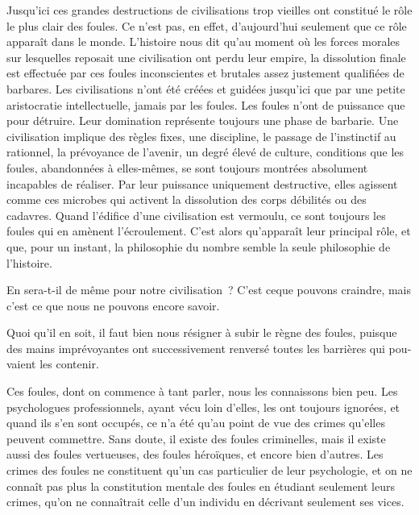 \documentclass[french,twoside]{book} %
\begin{document}
Jusqu’ici ces grandes destructions de civilisations trop vieilles ont constitué le rôle le plus clair des foules. Ce n’est pas, en effet, d’aujourd’hui seulement que ce rôle apparaît dans le monde. L’histoire nous dit qu’au moment où les forces morales sur lesquelles reposait une civilisation ont perdu leur empire, la dissolution finale est effectuée par ces foules inconscientes et brutales assez juste­ment qualifiées de barbares. Les civilisations n’ont été créées et guidées jusqu’ici que par une petite aristocratie intellectuelle, jamais par les foules. Les foules n’ont de puissance que pour détruire. Leur domination représente toujours une phase de barbarie. Une civilisation implique des règles fixes, une discipline, le passage de l’instinctif au rationnel, la prévoyance de l’avenir, un degré élevé de culture, conditions que les foules, abandon­nées à elles-mêmes, se sont toujours montrées absolument incapables de réaliser. Par leur puissance uniquement destructive, elles agissent comme ces microbes qui acti­vent la dissolution des corps débilités ou des cadavres. Quand l’édifice d’une civili­sation est ver­moulu, ce sont toujours les foules qui en amènent l’écroulement. C’est alors qu’apparaît leur principal rôle, et que, pour un instant, la philosophie du nombre semble la seule philosophie de l’histoire.\par
En sera-t-il de même pour notre civilisation ? C’est ceque pouvons craindre, mais c’est ce que nous ne pouvons encore savoir.\par
Quoi qu’il en soit, il faut bien nous résigner à subir le règne des foules, puisque des mains imprévoyantes ont successivement renversé toutes les barrières qui pou­vaient les contenir.\par
Ces foules, dont on commence à tant parler, nous les connaissons bien peu. Les psychologues professionnels, ayant vécu loin d’elles, les ont toujours ignorées, et quand ils s’en sont occupés, ce n’a été qu’au point de vue des crimes qu’elles peuvent commettre. Sans doute, il existe des foules criminelles, mais il existe aussi des foules vertueuses, des foules héroïques, et encore bien d’autres. Les crimes des foules ne constituent qu’un cas particulier de leur psychologie, et on ne connaît pas plus la constitution mentale des foules en étudiant seulement leurs crimes, qu’on ne connaî­trait celle d’un individu en décrivant seulement ses vices.\par
\end{document}
